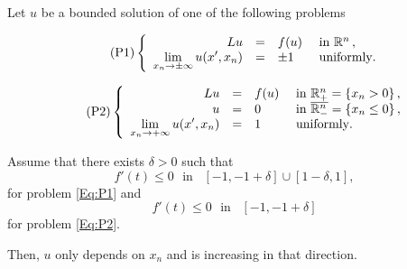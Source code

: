 









\begin{proposition}
\label{Prop:HalfSpaceLimUnif}
Let $u$ be a bounded solution of one of the following problems

\begin{equation}
\leqnomode
\tag{P1}
\label{Eq:P1}
\beqc{\PDEsystem}
L u &=& f(u)  &\textrm{ in }\R^n\,,\\
\ds \lim_{x_n \to \pm \infty} u(x',x_n) &=& \pm 1 \,\,\, &\textrm{ uniformly}.
\eeqc
\end{equation}

\begin{equation}
\leqnomode
\tag{P2}
\label{Eq:P2}
\beqc{\PDEsystem}
L u &=& f(u)  &\textrm{ in }\R^n_+ = \{ x_n>0\} \,,\\ 
u &=& 0  &\textrm{ in }\overline{\R^n_-} = \{ x_n\leq 0\}\,,\\
\ds \lim_{x_n \to + \infty} u(x',x_n) &=& 1 \,\,\, &\textrm{ uniformly}.
\eeqc
\end{equation}

\reqnomode

Assume that there exists $\delta > 0$ such that
$$ f'(t) \leq 0 \,\, \text{ in } \,\,\, [-1,-1+\delta]\cup[1-\delta,1], $$
for problem \eqref{Eq:P1} and
$$ f'(t) \leq 0 \,\, \text{ in } \,\,\, [-1,-1+\delta] $$
for problem \eqref{Eq:P2}.

Then, $u$ only depends on $x_n$ and is increasing in that direction.
\end{proposition}

